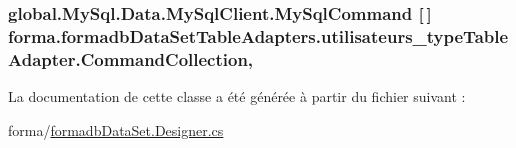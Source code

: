 \subsubsection[{\texorpdfstring{Command\+Collection}{CommandCollection}}]{\setlength{\rightskip}{0pt plus 5cm}global.\+My\+Sql.\+Data.\+My\+Sql\+Client.\+My\+Sql\+Command \mbox{[}$\,$\mbox{]} forma.\+formadb\+Data\+Set\+Table\+Adapters.\+utilisateurs\+\_\+type\+Table\+Adapter.\+Command\+Collection\hspace{0.3cm}{\ttfamily [get]}, {\ttfamily [protected]}}\hypertarget{classforma_1_1formadb_data_set_table_adapters_1_1utilisateurs__type_table_adapter_aae3642615f2cbeb11f3a100796e8f048}{}\label{classforma_1_1formadb_data_set_table_adapters_1_1utilisateurs__type_table_adapter_aae3642615f2cbeb11f3a100796e8f048}


La documentation de cette classe a été générée à partir du fichier suivant \+:\begin{DoxyCompactItemize}
\item 
forma/\hyperlink{formadb_data_set_8_designer_8cs}{formadb\+Data\+Set.\+Designer.\+cs}\end{DoxyCompactItemize}
